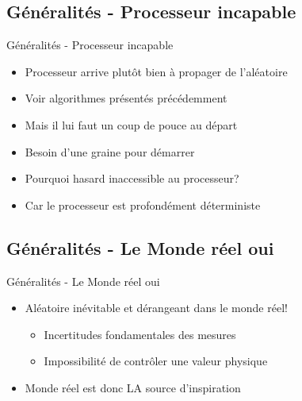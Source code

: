 \documentclass{beamer}
\begin{document}
\subsection{Généralités - Processeur incapable}
\begin{frame}{Généralités - Processeur incapable}
\begin{itemize}
 \item Processeur arrive plutôt bien à propager de l’aléatoire
 \item Voir algorithmes présentés précédemment
 \item Mais il lui faut un coup de pouce au départ
 \item  Besoin d’une graine pour démarrer
 \item Pourquoi hasard inaccessible au processeur?
 \item Car le processeur est profondément déterministe
 \end{itemize}  
\end{frame}

\subsection{Généralités - Le Monde réel oui}
\begin{frame}{Généralités - Le Monde réel oui}
 \begin{itemize}
 \item Aléatoire inévitable et dérangeant dans le monde réel!
   \begin{itemize}
   \item Incertitudes fondamentales des mesures
   \item Impossibilité de contrôler une valeur physique
   \end{itemize}
 \item Monde réel est donc LA source d’inspiration
 \end{itemize}
\end{frame}
\end{document}
